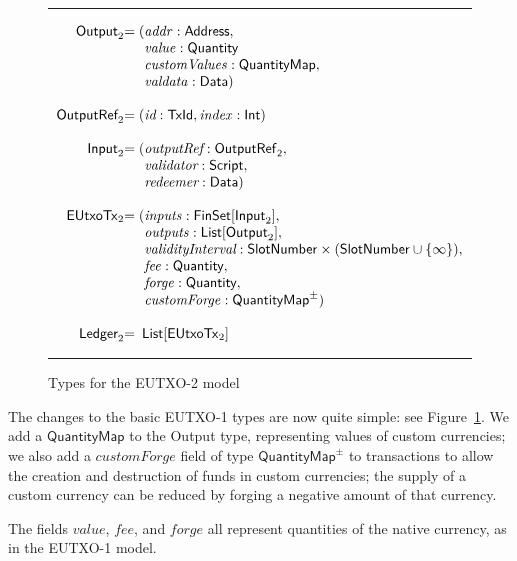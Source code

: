 \documentclass[a4paper]{article}
\renewcommand{\i}{\textit}  %
\newcommand{\s}{\textsf}  %
\newenvironment{arraydefs}[1]{\setlength{\arraycolsep}{0pt}\begin{array}{#1}}{\end{array}}
\newcommand\rfskip{7pt}
\newenvironment{ruledfigure}[1]{\begin{figure}[#1]\hrule\vspace{\rfskip}}{\vspace{\rfskip}\hrule\end{figure}}
\newcommand{\List}[1]{\ensuremath{\s{List}[#1]}}
\newcommand{\FinSet}[1]{\ensuremath{\s{FinSet}[#1]}}
\newcommand{\mi}[1]{\ensuremath{\mathit{#1}}}
\newcommand{\idx}{\mi{index}}
\newcommand{\inputs}{\mi{inputs}}
\newcommand{\outputs}{\mi{outputs}}
\newcommand{\forge}{\mi{forge}}
\newcommand{\fee}{\mi{fee}}
\newcommand{\addr}{\mi{addr}}
\newcommand{\val}{\mi{value}}  %
\newcommand{\customvals}{\mi{customValues}}
\newcommand{\customforge}{\mi{customForge}}
\newcommand{\valdata}{\mi{valdata}}
\newcommand{\Data}{\ensuremath{\mathsf{Data}}}
\newcommand{\msf}[1]{\ensuremath{\mathsf{#1}}}
\newcommand{\slotnum}{\msf{SlotNumber}}
\newcommand{\eutxotx}{\msf{EUtxoTx}}
\newcommand{\qty}{\ensuremath{\s{Quantity}}}
\newcommand{\qtymap}{\ensuremath{\s{QuantityMap}}}
\begin{document}
\begin{ruledfigure}{H}
  \[
  \begin{arraydefs}{rll}
    \s{Output}_2 &= (&\addr: \s{Address},\\
    && \val: \qty\\
    && \customvals: \qtymap,\\
    && \valdata: \Data)\\
    \\
    \s{OutputRef}_2 &= (&\i{id}: \s{TxId}, \idx: \s{Int})\\
    \\
    \s{Input}_2 &= (& \i{outputRef}: \sf{OutputRef}_2,\\
                     && \i{validator}: \s{Script},\\
                     & & \i{redeemer}: \Data)\\
\\
    \eutxotx_2 &= ( &\inputs: \FinSet{\s{Input}_2},\\
    &&\outputs: \List{\s{Output}_2},\\
    &&\i{validityInterval}: \slotnum \times (\slotnum \cup \{\infty\}),\\
    &&\fee: \qty,\\
    &&\forge: \qty,\\
    &&\customforge: \qtymap^{\pm})\\
    \\
    \s{Ledger}_2 &=&\!\List{\eutxotx_2}\\
\end{arraydefs}
  \]
  \caption{Types for the EUTXO-2 model}
  \label{fig:eutxo-2-types}
\end{ruledfigure}

\noindent The changes to the basic EUTXO-1 types are now quite simple:
see Figure~\ref{fig:eutxo-2-types}.  We add a \qtymap{} to the
\s{Output} type, representing values of custom currencies; we also add
a \customforge{} field of type $\qtymap^{\pm}$ to transactions to
allow the creation and destruction of funds in custom currencies; the
supply of a custom currency can be reduced by forging a negative
amount of that currency.

The fields \val, \fee, and \forge{} all represent quantities of the
native currency, as in the EUTXO-1 model.
\end{document}
